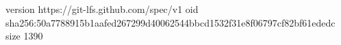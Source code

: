 version https://git-lfs.github.com/spec/v1
oid sha256:50a7788915b1aafed267299d40062544bbcd1532f31e8f06797cf82bf61ededc
size 1390
